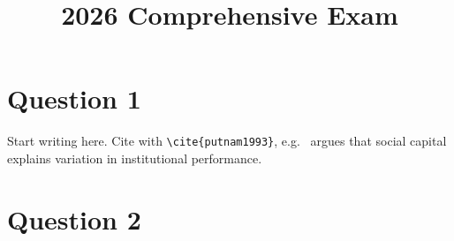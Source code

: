 \documentclass[12pt]{article}
\title{\textbf{2026 Comprehensive Exam}}
\author{}
\date{}
\begin{document}
\maketitle

\section{Question 1}

Start writing here. Cite with \texttt{\textbackslash cite\{putnam1993\}}, e.g.\ \cite{putnam1993} argues that social capital explains variation in institutional performance.

\cite{acemoglurobinson2006}

\cite{cox1997}

\cite{huntington1968}

\section{Question 2}





\end{document}
